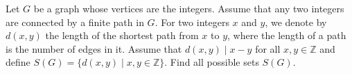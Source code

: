 Let $G$ be a graph whose vertices are the integers.
Assume that any two integers are connected by a finite path in $G$.
For two integers $x$ and $y$, we denote by $d(x,y)$ the length of the shortest path from $x$ to $y$,
where the length of a path is the number of edges in it.
Assume that $d(x,y)\mid x-y$ for all $x,y\in\mathbb{Z}$ and define $S(G) = \{d(x,y)\mid x,y\in\mathbb{Z}\}$.
Find all possible sets $S(G)$.
